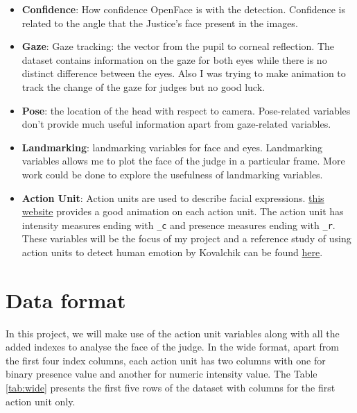 \documentclass{monashthesis}
\begin{document}
\begin{itemize}
\item
  \textbf{Confidence}: How confidence OpenFace is with the detection. Confidence is related to the angle that the Justice's face present in the images.
\item
  \textbf{Gaze}: Gaze tracking: the vector from the pupil to corneal reflection. The dataset contains information on the gaze for both eyes while there is no distinct difference between the eyes. Also I was trying to make animation to track the change of the gaze for judges but no good luck.
\item
  \textbf{Pose}: the location of the head with respect to camera. Pose-related variables don't provide much useful information apart from gaze-related variables.
\item
  \textbf{Landmarking}: landmarking variables for face and eyes. Landmarking variables allows me to plot the face of the judge in a particular frame. More work could be done to explore the usefulness of landmarking variables.
\item
  \textbf{Action Unit}: Action units are used to describe facial expressions. \href{https://imotions.com/blog/facial-action-coding-system/}{this website} provides a good animation on each action unit. The action unit has intensity measures ending with \texttt{\_c} and presence measures ending with \texttt{\_r}. These variables will be the focus of my project and a reference study of using action units to detect human emotion by Kovalchik can be found \href{http://www.sloansportsconference.com/wp-content/uploads/2018/02/2005.pdf}{here}.
\end{itemize}

\hypertarget{data-format}{%
\section{Data format}\label{data-format}}

In this project, we will make use of the action unit variables along with all the added indexes to analyse the face of the judge. In the wide format, apart from the first four index columns, each action unit has two columns with one for binary presence value and another for numeric intensity value. The Table \ref{tab:wide} presents the first five rows of the dataset with columns for the first action unit only.
\end{document}
